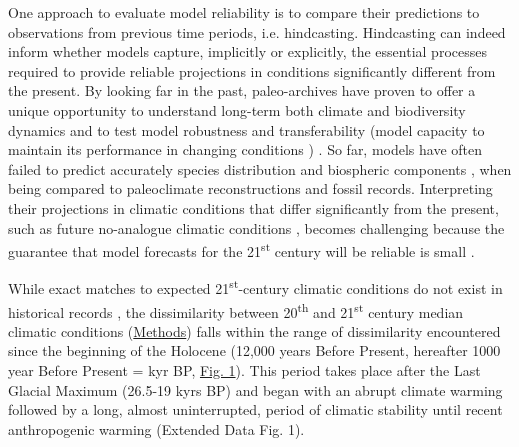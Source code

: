 \documentclass[pdflatex, sn-nature]{sn-jnl}%
\begin{document}
One approach to evaluate model reliability is to compare their predictions to observations from previous time periods, i.e. hindcasting. Hindcasting can indeed inform whether models capture, implicitly or explicitly, the essential processes required to provide reliable projections in conditions significantly different from the present. By looking far in the past, paleo-archives have proven to offer a unique opportunity to understand long-term both climate and biodiversity dynamics \cite{Fordham2020} and to test model robustness and transferability (model capacity to maintain its performance in changing conditions \cite{UribeRivera2022})   \cite{Braconnot2012, Maguire2015}.  So far, models have often failed to predict accurately species distribution and biospheric components \cite{Veloz2012, Pearman2008, Roberts2012, Foley2013, Maguire2016}, when being compared to paleoclimate reconstructions and fossil records. Interpreting their projections in climatic conditions that differ significantly from the present, such as future no-analogue climatic conditions \cite{Williams2007}, becomes challenging because the guarantee that model forecasts for the 21\textsuperscript{st} century will be reliable is small \cite{Fitzpatrick2018}.

While exact matches to expected 21\textsuperscript{st}-century climatic conditions do not exist in historical records \cite{Burke2018}, the dissimilarity between 20\textsuperscript{th} and 21\textsuperscript{st} century median climatic conditions (\hyperref[methods]{Methods}) falls within the range of dissimilarity encountered since the beginning of the Holocene (12,000 years Before Present, hereafter 1000 year Before Present = kyr BP, \hyperref[climatic_dissimilarity]{Fig. 1}). This period takes place after the Last Glacial Maximum (26.5-19 kyrs BP) and began with an abrupt climate warming followed by a long, almost uninterrupted, period of climatic stability until recent anthropogenic warming (Extended Data Fig. 1).  
\end{document}
